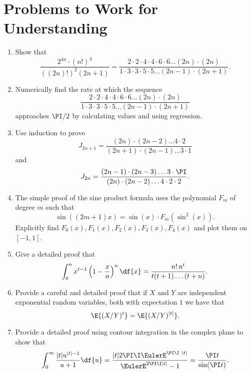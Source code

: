 \documentclass[12pt]{article}
\begin{document}
\section*{Problems to Work for Understanding}
\begin{enumerate}
    \item
        Show that
        \[
            \frac{ 2^{4n} \cdot (n!)^4}{((2n)!)^2(2n+1)} = \frac{ 2
            \cdot 2 \cdot 4 \cdot 4 \cdot 6 \cdot 6 \dots (2n) \cdot (2n)}
            {1 \cdot 3 \cdot 3 \cdot 5 \cdot 5 \dots (2n-1)\cdot(2n+1)}.
        \]%
    \item
        Numerically find the rate at which the sequence
        \[
            \frac{ 2 \cdot 2 \cdot 4 \cdot 4 \cdot 6 \cdot 6 \dots (2n)
            \cdot (2n)}{1 \cdot 3 \cdot 3 \cdot 5 \cdot 5 \dots (2n-1)\cdot
            (2n+1)}
        \] approaches \( \PI/2 \) by calculating values and using
        regression.
    \item
        Use induction to prove
        \[
            J_{2n+1} = \frac{(2n)\cdot (2n-2) \dots 4 \cdot 2}{(2n+1)
            \cdot (2n-1) \dots 3 \cdot 1}
        \] and
        \[
            J_{2n} = \frac{(2n-1)\cdot(2n-3) \dots 3 \cdot \PI}{(2n)\cdot
            (2n-2)\dots 4 \cdot 2 \cdot 2}.
        \]
    \item
        The simple proof of the sine product formula uses the polynomial
        \( F_m \) of degree \( m \) such that
        \[
            \sin( (2m+1)x ) = \sin(x) \cdot F_m(\sin^2(x)).
        \] Explicitly find \( F_0(x), F_1(x), F_2(x), F_3(x), F_4(x) \)
        and plot them on \( [-1,1] \).
    \item
        Give a detailed proof that
        \[
            \int_{0}^{n} x^{t-1}\left( 1 - \frac{x}{n} \right)^n \df{x}
            = \frac{n!  \, n^t}{t(t+1) \dots (t+n)}.
        \]
    \item
        Provide a careful and detailed proof that if \( X \) and \( Y \)
        are independent exponential random variables, both with
        expectation \( 1 \) we have that
        \[
            \E{ (X/Y)^t } = \E{(X/Y)^{|t|} }.
        \]
    \item
        Provide a detailed proof using contour integration in the
        complex plane to show that
        \[
            \int_{0}^{\infty} \frac{ |t| u^{|t|-1}}{u+1} \df{u} = \frac{|t|
            2 \PI \I \EulerE^{ \PI \I\ |t|}}{\EulerE^{2\PI \I |t|} - 1}
            = \frac{ \PI t}{\sin ( \PI t)}.
        \]

\end{enumerate}
\end{document}

